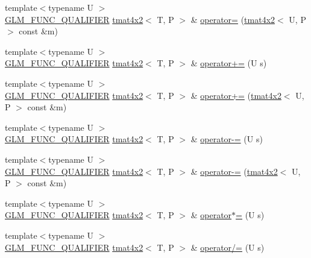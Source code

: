 \begin{DoxyCompactItemize}
\item 
{\footnotesize template$<$typename U $>$ }\\\hyperlink{setup_8hpp_a33fdea6f91c5f834105f7415e2a64407}{G\+L\+M\+\_\+\+F\+U\+N\+C\+\_\+\+Q\+U\+A\+L\+I\+F\+I\+ER} \hyperlink{structglm_1_1detail_1_1tmat4x2}{tmat4x2}$<$ T, P $>$ \& \hyperlink{structglm_1_1detail_1_1tmat4x2_a2944e0d88d5337848dc71a591f6769e4}{operator=} (\hyperlink{structglm_1_1detail_1_1tmat4x2}{tmat4x2}$<$ U, P $>$ const \&m)
\item 
{\footnotesize template$<$typename U $>$ }\\\hyperlink{setup_8hpp_a33fdea6f91c5f834105f7415e2a64407}{G\+L\+M\+\_\+\+F\+U\+N\+C\+\_\+\+Q\+U\+A\+L\+I\+F\+I\+ER} \hyperlink{structglm_1_1detail_1_1tmat4x2}{tmat4x2}$<$ T, P $>$ \& \hyperlink{structglm_1_1detail_1_1tmat4x2_a9512b9a0aa009befd7905ab1ecbb966c}{operator+=} (U s)
\item 
{\footnotesize template$<$typename U $>$ }\\\hyperlink{setup_8hpp_a33fdea6f91c5f834105f7415e2a64407}{G\+L\+M\+\_\+\+F\+U\+N\+C\+\_\+\+Q\+U\+A\+L\+I\+F\+I\+ER} \hyperlink{structglm_1_1detail_1_1tmat4x2}{tmat4x2}$<$ T, P $>$ \& \hyperlink{structglm_1_1detail_1_1tmat4x2_a39682439b0540114d8a90dfb96ff09e7}{operator+=} (\hyperlink{structglm_1_1detail_1_1tmat4x2}{tmat4x2}$<$ U, P $>$ const \&m)
\item 
{\footnotesize template$<$typename U $>$ }\\\hyperlink{setup_8hpp_a33fdea6f91c5f834105f7415e2a64407}{G\+L\+M\+\_\+\+F\+U\+N\+C\+\_\+\+Q\+U\+A\+L\+I\+F\+I\+ER} \hyperlink{structglm_1_1detail_1_1tmat4x2}{tmat4x2}$<$ T, P $>$ \& \hyperlink{structglm_1_1detail_1_1tmat4x2_a1e70f82c8238bde1d32bb4398464079c}{operator-\/=} (U s)
\item 
{\footnotesize template$<$typename U $>$ }\\\hyperlink{setup_8hpp_a33fdea6f91c5f834105f7415e2a64407}{G\+L\+M\+\_\+\+F\+U\+N\+C\+\_\+\+Q\+U\+A\+L\+I\+F\+I\+ER} \hyperlink{structglm_1_1detail_1_1tmat4x2}{tmat4x2}$<$ T, P $>$ \& \hyperlink{structglm_1_1detail_1_1tmat4x2_a85080df35d7d859072e4bdcd955747d5}{operator-\/=} (\hyperlink{structglm_1_1detail_1_1tmat4x2}{tmat4x2}$<$ U, P $>$ const \&m)
\item 
{\footnotesize template$<$typename U $>$ }\\\hyperlink{setup_8hpp_a33fdea6f91c5f834105f7415e2a64407}{G\+L\+M\+\_\+\+F\+U\+N\+C\+\_\+\+Q\+U\+A\+L\+I\+F\+I\+ER} \hyperlink{structglm_1_1detail_1_1tmat4x2}{tmat4x2}$<$ T, P $>$ \& \hyperlink{structglm_1_1detail_1_1tmat4x2_a2fc51001f24270fc2c93b824668678ad}{operator$\ast$=} (U s)
\item 
{\footnotesize template$<$typename U $>$ }\\\hyperlink{setup_8hpp_a33fdea6f91c5f834105f7415e2a64407}{G\+L\+M\+\_\+\+F\+U\+N\+C\+\_\+\+Q\+U\+A\+L\+I\+F\+I\+ER} \hyperlink{structglm_1_1detail_1_1tmat4x2}{tmat4x2}$<$ T, P $>$ \& \hyperlink{structglm_1_1detail_1_1tmat4x2_acfd79479bd1ebfb4a6c7c654d0648a5b}{operator/=} (U s)
\end{DoxyCompactItemize}


